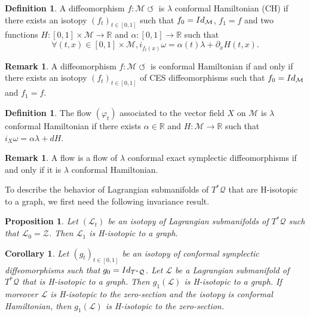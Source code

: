 \documentclass[11pt]{article}
\numberwithin{equation}{section}
\numberwithin{figure}{section}
\numberwithin{table}{section}
\providecommand{\righttoleftarrow}{\mathrel{\circlearrowleft}}
\newtheorem{corollary}{Corollary}
\newtheorem{proposition}{Proposition}
\theoremstyle{definition}
\newtheorem{remark}[theorem]{Remark}
\newtheorem{definition}[theorem]{Definition}
\def\R{\mathbb{R}}
\def\cL{{\mathcal L}}
\def\cM{{\mathcal M}}
\def\cQ{{\mathcal Q}}
\def\cZ{{\mathcal Z}}
\begin{document}
\begin{definition}
A diffeomorphism $f: \cM \righttoleftarrow$ is $\lambda$ conformal Hamiltonian (CH) if there exists an isotopy $(f_t)_{t\in[0, 1]}$ such that $f_0={\rm Id}_\cM$, $f_1=f$ and two functions $H:[0, 1]\times \cM\to \R$ and $\alpha:[0, 1]\to \R$ such that
\[
\forall (t, x)\in [0, 1]\times \cM, i_{\dot f_t(x)}\omega=\alpha(t)\lambda+\partial_xH(t, x).
\]
\end{definition}

\begin{remark}
A diffeomorphism $f: \cM \righttoleftarrow$ is conformal Hamiltonian if and only if there exists an isotopy $(f_t)_{t\in[0, 1]}$ of CES diffeomorphisms such that $f_0={\rm Id}_\cM$ and $f_1=f$.
\end{remark}

\begin{definition}
The flow $(\varphi_t)$ associated to the vector field $X$ on $\cM$ is $\lambda$ conformal Hamiltonian if there exists $\alpha\in \R$ and $H:\cM\to \R$ such that $i_X\omega=\alpha \lambda +dH$.
\end{definition}

\begin{remark}
A flow is a flow of $\lambda$ conformal exact symplectic diffeomorphisms if and only if it is $\lambda$ conformal Hamiltonian.
\end{remark}

To describe the behavior of Lagrangian submanifolds of $T^*\cQ$ that are H-isotopic to a graph, we first need the following invariance result.
\begin{proposition}
\label{Pisotopytograph}
Let $(\cL_t)$ be an isotopy of Lagrangian submanifolds of $T^*\cQ$ such that $\cL_0=\cZ$. Then $\cL_1$ is H-isotopic to a graph.
\end{proposition}

\begin{corollary}
\label{PHisotopytograph}
Let $(g_t)_{t\in[0, 1]}$ be an isotopy of conformal symplectic diffeomorphisms such that $g_0={\rm Id}_{T^*\cQ}$. Let $\cL$ be a Lagrangian submanifold of $T^*\cQ$ that is H-isotopic to a graph. Then $g_1(\cL)$ is H-isotopic to a graph. 
If moreover $\cL$ is H-isotopic to the zero-section and the isotopy is conformal Hamiltonian, then $g_1(\cL)$ is H-isotopic to the zero-section.
\end{corollary}
\end{document}
